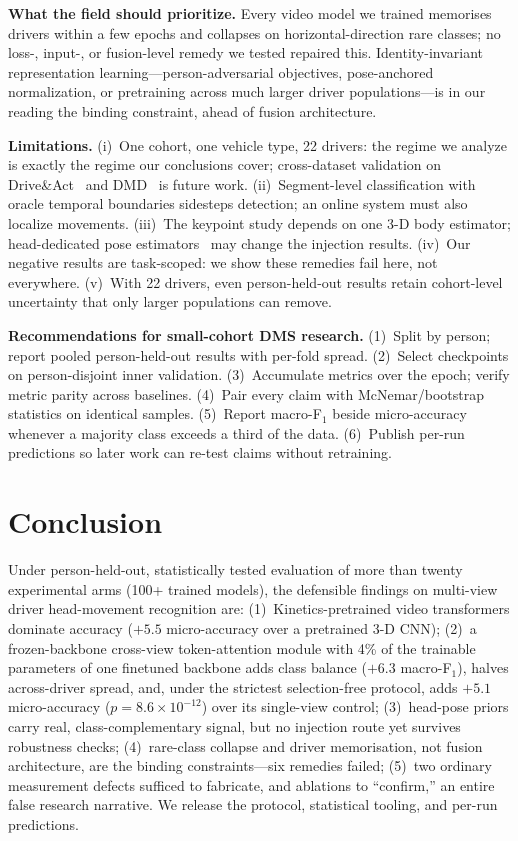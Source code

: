 \documentclass[journal]{IEEEtran}
\newcommand{\micro}{micro-accuracy}
\newcommand{\mF}{macro-F$_1$}
\begin{document}
\textbf{What the field should prioritize.}  Every video model we trained
memorises drivers within a few epochs and collapses on horizontal-direction
rare classes; no loss-, input-, or fusion-level remedy we tested repaired
this.  Identity-invariant representation learning---person-adversarial
objectives, pose-anchored normalization, or pretraining across much larger
driver populations---is in our reading the binding constraint, ahead of
fusion architecture.

\textbf{Limitations.}  (i)~One cohort, one vehicle type, 22 drivers: the
regime we analyze is exactly the regime our conclusions cover;
cross-dataset validation on Drive\&Act~\cite{martin2019driveact} and
DMD~\cite{ortega2020dmd} is future work.  (ii)~Segment-level classification
with oracle temporal boundaries sidesteps detection; an online system must
also localize movements.  (iii)~The keypoint study depends on one 3-D body
estimator; head-dedicated pose estimators~\cite{ruiz2018hopenet,
zhou2020whenet} may change the injection results.  (iv)~Our negative
results are task-scoped: we show these remedies fail here, not everywhere.
(v)~With 22 drivers, even person-held-out results retain cohort-level
uncertainty that only larger populations can remove.

\textbf{Recommendations for small-cohort DMS research.}
(1)~Split by person; report pooled person-held-out results with per-fold
spread.  (2)~Select checkpoints on person-disjoint inner validation.
(3)~Accumulate metrics over the epoch; verify metric parity across
baselines.  (4)~Pair every claim with McNemar/bootstrap statistics on
identical samples.  (5)~Report \mF{} beside \micro{} whenever a majority
class exceeds a third of the data.  (6)~Publish per-run predictions so
later work can re-test claims without retraining.

\section{Conclusion}
Under person-held-out, statistically tested evaluation of more than twenty
experimental arms (100+ trained models), the defensible findings on
multi-view driver head-movement recognition are:
(1)~Kinetics-pretrained video transformers dominate accuracy
($+5.5$ \micro{} over a pretrained 3-D CNN);
(2)~a frozen-backbone cross-view token-attention module with 4\% of the
trainable parameters of one finetuned backbone adds class balance
($+6.3$ \mF), halves across-driver spread, and, under the strictest
selection-free protocol, adds $+5.1$ \micro{} ($p{=}8.6\times10^{-12}$)
over its single-view control;
(3)~head-pose priors carry real, class-complementary signal, but no
injection route yet survives robustness checks;
(4)~rare-class collapse and driver memorisation, not fusion architecture,
are the binding constraints---six remedies failed;
(5)~two ordinary measurement defects sufficed to fabricate, and ablations
to ``confirm,'' an entire false research narrative.
We release the protocol, statistical tooling, and per-run predictions.
\end{document}
